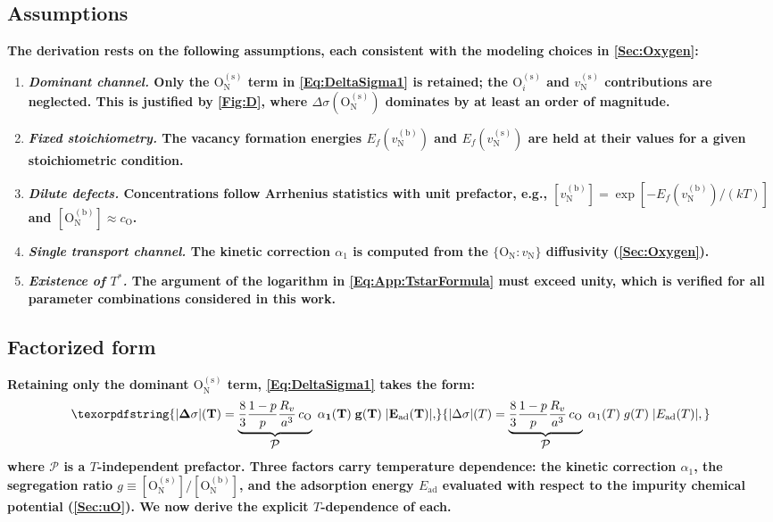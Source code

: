 \documentclass[preprint,12pt,sort&compress]{elsarticle}
\newcommand{\?}{\stackrel{?}{=}}
\providecommand{\DIFaddtex}[1]{{\bf #1}} %
\providecommand{\DIFadd}[1]{\texorpdfstring{\DIFaddtex{#1}}{#1}} %
\begin{document}
\subsection{\DIFadd{Assumptions}}
\label{App:Tpeak:Assumptions}

\DIFadd{The derivation rests on the following assumptions, each consistent with the modeling choices in \cref{Sec:Oxygen}:
}\begin{enumerate}[label=(\roman*)]
    \item \DIFadd{\textit{Dominant channel.} Only the $\text{O}_\text{N}^{(\text{s})}$ term in \cref{Eq:DeltaSigma1} is retained; the $\text{O}_i^{(\text{s})}$ and $v_\text{N}^{(\text{s})}$ contributions are neglected. This is justified by \cref{Fig:D}, where $\Delta \sigma(\text{O}_\text{N}^{(\text{s})})$ dominates by at least an order of magnitude.
    }\item \DIFadd{\textit{Fixed stoichiometry.} The vacancy formation energies $E_f(v_\text{N}^{(\text{b})})$ and $E_f(v_\text{N}^{(\text{s})})$ are held at their values for a given stoichiometric condition.
    }\item \DIFadd{\textit{Dilute defects.} Concentrations follow Arrhenius statistics with unit prefactor, e.g., $[v_\text{N}^{(\text{b})}] = \exp[-E_f(v_\text{N}^{(\text{b})})/(kT)]$ and $[\text{O}_\text{N}^{(\text{b})}] \approx c_\text{O}$.
    }\item \DIFadd{\textit{Single transport channel.} The kinetic correction $\alpha_1$ is computed from the $\{\text{O}_\text{N} : v_\text{N}\}$ diffusivity (\cref{Sec:Oxygen}).
    }\item \DIFadd{\textit{Existence of $T^*$.} The argument of the logarithm in \cref{Eq:App:TstarFormula} must exceed unity, which is verified for all parameter combinations considered in this work.
}\end{enumerate}

\subsection{\DIFadd{Factorized form}}
\label{App:Tpeak:Factorization}

\DIFadd{Retaining only the dominant $\text{O}_\text{N}^{(\text{s})}$ term, \cref{Eq:DeltaSigma1} takes the form:
}\begin{equation}
\DIFadd{|\Delta \sigma|(T) = \underbrace{\frac{8}{3}\frac{1-p}{p}\frac{R_v}{a^3}\,c_\text{O}}_{\displaystyle\mathcal{P}}\;\alpha_1(T)\;g(T)\;|E_\text{ad}(T)|,
\label{Eq:App:Factorization}
}\end{equation}
\DIFadd{where $\mathcal{P}$ is a $T$-independent prefactor. Three factors carry temperature dependence: the kinetic correction $\alpha_1$, the segregation ratio $g \equiv [\text{O}_\text{N}^{(\text{s})}]/[\text{O}_\text{N}^{(\text{b})}]$, and the adsorption energy $E_\text{ad}$ evaluated with respect to the impurity chemical potential (\cref{Sec:uO}). We now derive the explicit $T$-dependence of each.
}
\end{document}
